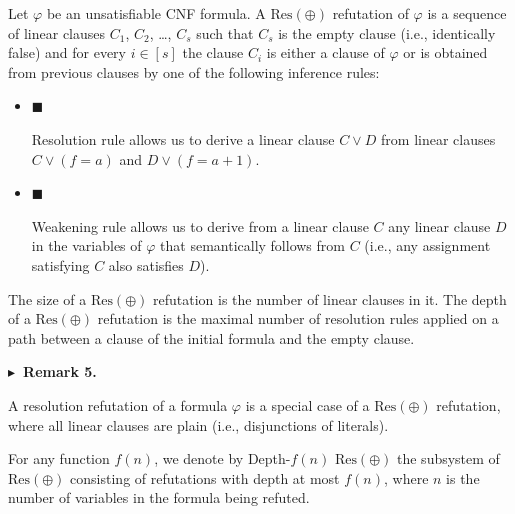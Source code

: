 \documentclass[10pt,a4paper]{article}
\begin{document}
Let $\varphi$ be an unsatisfiable CNF formula.
A $\mathrm{Res}(\oplus)$ refutation of $\varphi$ is a sequence of linear clauses
$C_{1}$, $C_{2}$, …, $C_{s}$ such that $C_{s}$ is the empty clause (i.e., identically false) and
for every $i\in[s]$ the clause $C_{i}$ is either a clause of $\varphi$ or is obtained from
previous clauses by one of the following inference rules:\par


\begin{itemize}


\item 
$\blacksquare$ 


Resolution rule allows us to derive a linear clause $C\lor D$
from linear clauses $C\lor(f=a)$ and $D\lor(f=a+1)$.\par





\item 
$\blacksquare$ 


Weakening rule allows us to derive from a linear clause $C$ any
linear clause $D$ in the variables of $\varphi$
that semantically follows from $C$ (i.e., any assignment satisfying $C$
also satisfies $D$).\par





\end{itemize}



The size of a $\mathrm{Res}(\oplus)$ refutation is the number of linear clauses in it.
The depth of a $\mathrm{Res}(\oplus)$ refutation is the
maximal number of resolution rules applied on a path between a clause of the initial
formula and the empty clause.\par



\par\medskip\noindent\textbf{
$\blacktriangleright$ Remark 5.
}\par



A resolution refutation of a formula $\varphi$ is a special case of a $\mathrm{Res}(\oplus)$ refutation,
where all linear clauses are plain (i.e., disjunctions of literals).\par




For any function $f(n)$, we denote by Depth-$f(n)$ $\mathrm{Res}(\oplus)$ the subsystem of $\mathrm{Res}(\oplus)$
consisting of refutations with depth at most $f(n)$, where $n$ is the number of variables in
the formula being refuted.\par
\end{document}

